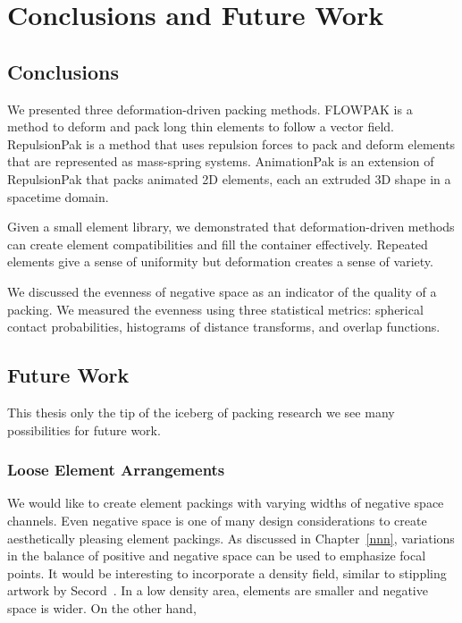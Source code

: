 
\chapter{Conclusions and Future Work}
\label{chapter_conclusions_and_future_work}

\section{Conclusions}

\newtext
{
We presented three deformation-driven packing methods.
FLOWPAK is a method to deform and pack long thin elements to follow a vector field.
RepulsionPak is a method that uses repulsion forces to pack and deform
elements that are represented as mass-spring systems.
AnimationPak is an extension of RepulsionPak that packs animated 2D elements,
each an extruded 3D shape in a spacetime domain.
}

\newtext
{
Given a small element library, 
we demonstrated that deformation-driven methods can create element compatibilities
and fill the container effectively.
Repeated elements give a sense of uniformity but deformation creates a sense of variety.
}

\newtext
{
We discussed the evenness of negative space as an indicator of the quality of a packing.
We measured the evenness using three statistical metrics:
spherical contact probabilities, histograms of distance transforms, and overlap functions.
}

\section{Future Work}

\newtext
{
This thesis  only the tip of the iceberg of packing research 
we see many possibilities for future work.
}

\subsection{Loose Element Arrangements}
We would like to create element packings with varying widths of negative space channels.
Even negative space is one of many design considerations to create aesthetically pleasing element packings.
As discussed in Chapter~\ref{nnn}, variations in the balance of positive and negative space can be used to emphasize focal points.
It would be interesting to incorporate a density field, similar to stippling artwork by Secord~\cite{Secord2002}.
In a low density area, elements are smaller and negative space is wider. On the other hand, 



